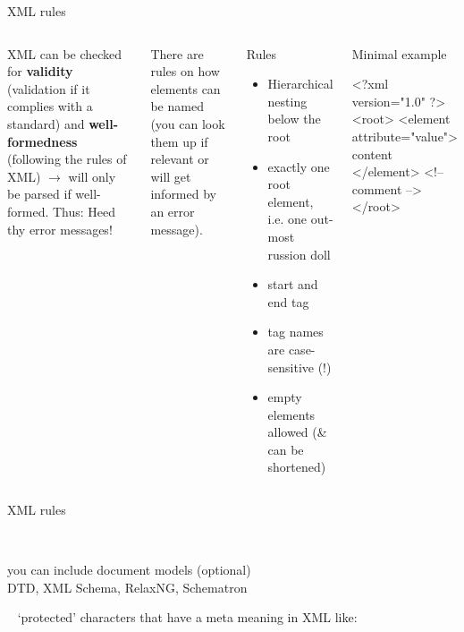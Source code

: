 \begin{frame}[fragile]{XML rules}
\begin{columns}
\small
XML can be checked for \textbf{validity} (validation if it complies with a standard) and \textbf{well-formedness} (following the rules of XML) $\to$ will only be parsed if well-formed. Thus: \alert{Heed thy error messages!}\smallskip

There are rules on how elements can be named (you can look them up if relevant or will get informed by an error message). 

\bigskip


\footnotesize
{}
\begin{block}{Rules}
\begin{itemize}
    \item Hierarchical nesting below the root
    \item exactly one root element, i.e. one out-most russion doll
    \item start and end tag 
    \item tag names are case-sensitive (!) 
    \item empty elements allowed (\& can be shortened) 
\end{itemize}
\end{block}
\bigskip 

\begin{block}{Minimal example}
\begin{xmlcode}
<?xml version="1.0" ?>
<root>
  <element attribute="value">
    content
  </element>
  <!-- comment -->
</root>
\end{xmlcode}
\end{block}
\end{columns}

\end{frame}




\begin{frame}{XML rules}

\small

~ \\
\bigskip

you can include document models (optional) \\
DTD, XML Schema, RelaxNG, Schematron 
\bigskip

~ `protected' characters that have a meta meaning in XML like: \\


\end{frame}


